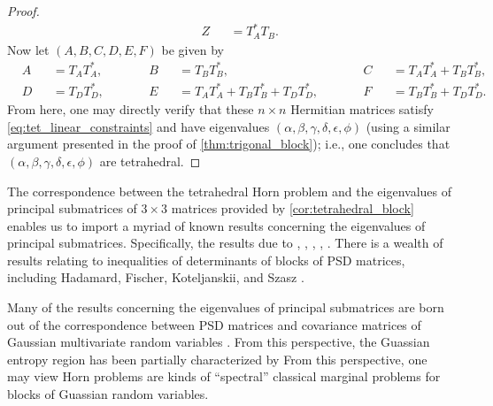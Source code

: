 \documentclass[notitlepage, 10pt]{article}
\begin{document}
\begin{proof}
\begin{equation}
\begin{alignedat}{6}
            &&Z &&= T_{A}^{*}T_{B}.
        \end{alignedat}
    \end{equation}
    Now let $(A,B,C,D,E,F)$ be given by 
    \begin{equation}
        \begin{alignedat}{6}
            &A &&= T_{A}T_{A}^{*}, \qquad
            &&B &&= T_{B}T_{B}^{*}, \qquad
            &&C &&= T_{A}T_{A}^{*} + T_{B}T_{B}^{*}, \\
            &D &&= T_{D}T_{D}^{*}, \qquad
            &&E &&= T_{A}T_{A}^{*} + T_{B}T_{B}^{*} + T_{D}T_{D}^{*}, \qquad
            &&F &&= T_{B}T_{B}^{*} + T_{D}T_{D}^{*}.
        \end{alignedat}
    \end{equation}
    From here, one may directly verify that these $n\times n$ Hermitian matrices satisfy \cref{eq:tet_linear_constraints}
    and have eigenvalues $(\alpha,\beta,\gamma,\delta,\epsilon,\phi)$ (using a similar argument presented in the proof of \cref{thm:trigonal_block}); i.e., one concludes that $(\alpha,\beta,\gamma,\delta,\epsilon,\phi)$ are tetrahedral.
\end{proof}

\begin{rem}
    The correspondence between the tetrahedral Horn problem and the eigenvalues of principal submatrices of $3\times 3$ matrices provided by \cref{cor:tetrahedral_block} enables us to import a myriad of known results concerning the eigenvalues of principal submatrices.
    Specifically, the results due to \citeauthor{audenaert2010strongly} \cite{audenaert2010strongly}, \citeauthor{lami2017log} \cite{lami2017log}, \citeauthor{niculescu2025old} \cite{niculescu2025old}, \citeauthor{paksoy2014inequalities} \cite{paksoy2014inequalities}, \citeauthor{lewin2014family} \cite{lewin2014family}.
    There is a wealth of results relating to inequalities of determinants of blocks of PSD matrices, including Hadamard, Fischer, Koteljanskii, and Szasz \cite{johnson1993determinantal}.

    Many of the results concerning the eigenvalues of principal submatrices are born out of the correspondence between PSD matrices and covariance matrices of Gaussian multivariate random variables \cite{lami2017log}.
    From this perspective, the Guassian entropy region has been partially characterized by \citeauthor{shadbakht2011entropy} \cite{shadbakht2011entropy,hassibi2008entropy}
    From this perspective, one may view Horn problems are kinds of ``spectral'' classical marginal problems for blocks of Guassian random variables.
\end{rem}
\end{document}
